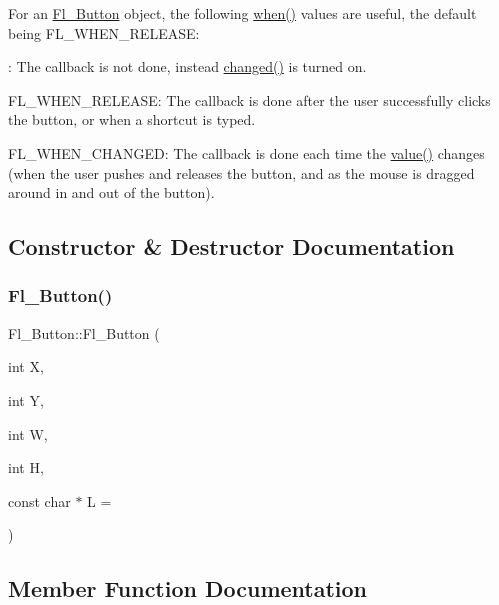 For an \hyperlink{class_fl___button}{Fl\+\_\+\+Button} object, the following \hyperlink{class_fl___widget_ad4ef380ffb50f4d00fe93f7b6677e9e1}{when()} values are useful, the default being {\ttfamily F\+L\+\_\+\+W\+H\+E\+N\+\_\+\+R\+E\+L\+E\+A\+SE\+:} \begin{DoxyItemize}
\item {}\+: The callback is not done, instead \hyperlink{class_fl___widget_af007a3c83ac176a7511df8df0706947c}{changed()} is turned on. \item {\ttfamily F\+L\+\_\+\+W\+H\+E\+N\+\_\+\+R\+E\+L\+E\+A\+SE\+:} The callback is done after the user successfully clicks the button, or when a shortcut is typed. \item {\ttfamily F\+L\+\_\+\+W\+H\+E\+N\+\_\+\+C\+H\+A\+N\+G\+ED\+:} The callback is done each time the \hyperlink{class_fl___button_aceffc03f6b14f180a1639e26c91f9a4a}{value()} changes (when the user pushes and releases the button, and as the mouse is dragged around in and out of the button). \end{DoxyItemize}


\subsection{Constructor \& Destructor Documentation}
\mbox{\label{class_fl___button_af943da36e7d89f77172799ee6da91f03}} 
\subsubsection{\texorpdfstring{Fl\+\_\+\+Button()}{Fl\_Button()}}
{\footnotesize\ttfamily Fl\+\_\+\+Button\+::\+Fl\+\_\+\+Button (\begin{DoxyParamCaption}\item[{int}]{X,  }\item[{int}]{Y,  }\item[{int}]{W,  }\item[{int}]{H,  }\item[{const char $\ast$}]{L = {} }\end{DoxyParamCaption})}



\subsection{Member Function Documentation}
\mbox{\label{class_fl___button_a22833ffc9190f26c67896662a0b11f9a}} 

